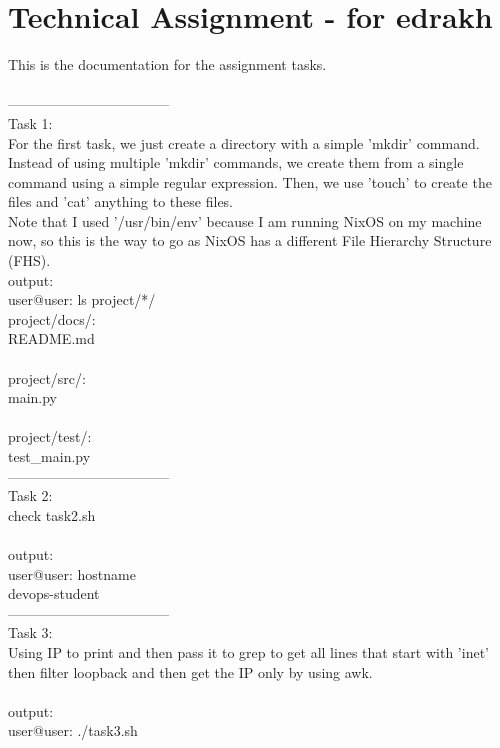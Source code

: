 \documentclass[a4paper,14pt]{extarticle}
\author{}
\date{}
\begin{document}
\noindent
\newpage

\section*{Technical Assignment - for edrakh}
This is the documentation for the assignment tasks.
\\
\\
-----------------------------------\\
Task 1: \\
For the first task, we just create a directory with a simple 'mkdir' command. Instead of using multiple 'mkdir' commands, we create them from
a single command using a simple regular expression. Then, we use 'touch' to create the files and 'cat' anything to these files.
\\
Note that I used '/usr/bin/env' because I am running NixOS on my machine now, so this is the way to go as NixOS has a different File
Hierarchy Structure (FHS).
\\
output:\\
user@user:  ls project/*/\\
project/docs/:\\
README.md\\
\\
project/src/:\\
main.py\\
\\
project/test/:\\
test\_main.py\\
-----------------------------------\\
Task 2:\\
check task2.sh\\
\\
output:\\
user@user:  hostname\\
devops-student\\
-----------------------------------\\
Task 3:\\
Using IP to print and then pass it to grep to get all lines that start with 'inet' then filter loopback and then get the IP only by using awk.\\
\\
output:\\
user@user:  ./task3.sh\\
\end{document}
